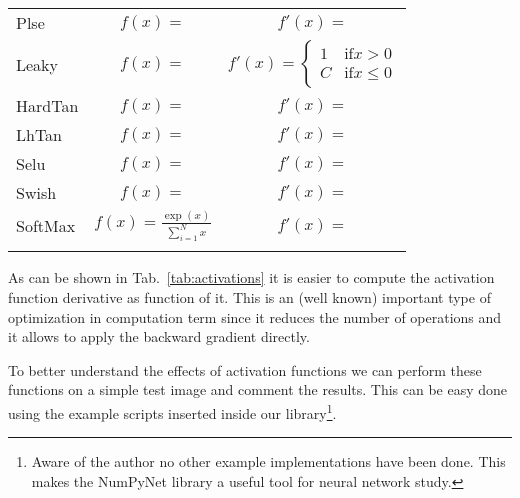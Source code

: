 \documentclass{standalone}
\begin{document}
\begin{table*}
\begin{tabular}{lcc}
Plse     &  $f(x) = $                               &  $f'(x) = $                                                                                            \\

Leaky    &  $f(x) = $                               &  $f'(x) = \left\{\begin{array}{rl} 1   & \mbox{if} x>0   \\ C   & \mbox{if} x\leq0 \end{array}\right.$ \\

HardTan  &  $f(x) = $                               &  $f'(x) = $                                                                                            \\

LhTan    &  $f(x) = $                               &  $f'(x) = $                                                                                            \\

Selu     &  $f(x) = $                               &  $f'(x) = $                                                                                            \\

Swish    &  $f(x) = $                               &  $f'(x) = $                                                                                            \\

SoftMax  &  $f(x) =\frac{\exp(x)}{\sum_{i=1}^{N}x}$ &  $f'(x) = $                                                                                            \\

\hline\\
\end{tabular}
\caption{List of common activation functions with correspondig mathematical equation and derivative.
The derivative is expressed as function of $f(x)$ to optimize their numerical evaluation.}
\label{tab:activations}
\end{table*}

As can be shown in Tab.~\ref{tab:activations} it is easier to compute the activation function derivative as function of it.
This is an (well known) important type of optimization in computation term since it reduces the number of operations and it allows to apply the backward gradient directly.

To better understand the effects of activation functions we can perform these functions on a simple test image and comment the results.
This can be easy done using the example scripts inserted inside our library\footnote{
  Aware of the author no other example implementations have been done.
  This makes the NumPyNet library a useful tool for neural network study.
}.
\end{document}
